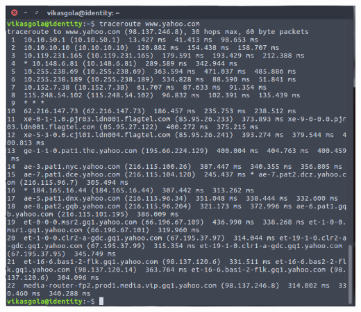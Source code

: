 \documentclass[14pt]{extarticle}
\begin{document}
    \includegraphics[scale=0.48]{2}
    \vspace{1cm}
\end{document}
